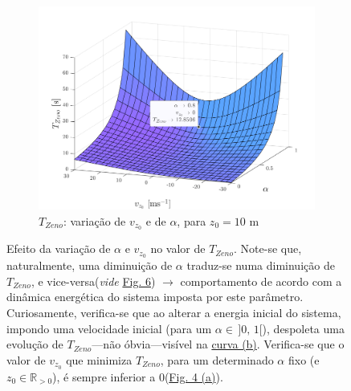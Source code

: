 \begin{figure}[H]
\begin{subfigure}[b]{0.33\linewidth}
        \label{fig:veloTinf} 
    \end{subfigure}
    \begin{subfigure}[b]{0.33\linewidth}
        \centering
        \includegraphics[width=1\linewidth]{img/P1/P1-3dplot.png} 
        \caption{$T_{Zeno}$: variação de $v_{z_0}$ e de $\alpha$, para $z_0 = 10$ m} 
        \label{fig:3dplot} 
    \end{subfigure} 
    \caption{Efeito da variação de $\alpha$ e $v_{z_0}$ no valor de $T_{Zeno}$. Note-se que, naturalmente, uma diminuição de $\alpha$ traduz-se numa diminuição de $T_{Zeno}$, e vice-versa\protect\footnotemark[6] (\textit{vide} \hyperref[fig:phase-portrait-limites]{Fig. 6}) $\rightarrow$ comportamento de acordo com a dinâmica energética do sistema imposta por este parâmetro. Curiosamente, verifica-se que ao alterar a energia inicial do sistema, impondo uma velocidade inicial (para um $\alpha \in\, ]0,\, 1[$), despoleta uma evolução de $T_{Zeno}$---não óbvia---visível na \hyperref[fig:veloTinf]{curva (b)}. Verifica-se que o valor de $v_{z_0}$ que minimiza $T_{Zeno}$, para um determinado $\alpha$ fixo (e $z_0 \in \mathbb{R}_{>0}$), é sempre inferior a $0$\protect\renewcommand*{\thefootnote}{\fnsymbol{footnote}}\protect\footnotemark[2] (\hyperref[fig:Derivada]{Fig. 4 (a)}).}
\end{figure}

\renewcommand*{\thefootnote}{\arabic{footnote}}

